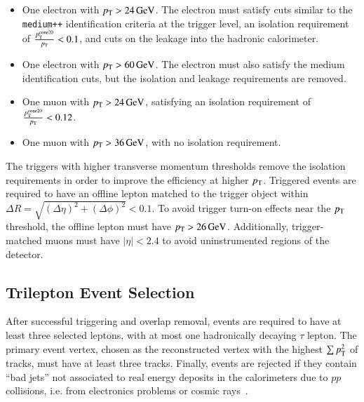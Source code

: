 \begin{itemize}
	\item One electron with $p_{\text{T}}>\SI{24}{\giga\electronvolt}$. The electron must satisfy cuts similar to the \texttt{medium++} identification criteria at the trigger level, an isolation requirement of $\frac{p_{\text{T}}^{\mathrm{cone}20}}{p_{\text{T}}}<0.1$, and cuts on the leakage into the hadronic calorimeter.
	\item One electron with $p_{\text{T}}>\SI{60}{\giga\electronvolt}$. The electron must also satisfy the medium identification cuts, but the isolation and leakage requirements are removed.
	\item One muon with $p_{\text{T}}>\SI{24}{\giga\electronvolt}$, satisfying an isolation requirement of $\frac{p_{\text{T}}^{\mathrm{cone}20}}{p_{\text{T}}}<0.12$.
	\item One muon with $p_{\text{T}}>\SI{36}{\giga\electronvolt}$, with no isolation requirement.
\end{itemize}

The triggers with higher transverse momentum thresholds remove the isolation requirements in order to improve the efficiency at higher $p_{\text{T}}$. Triggered events are required to have an offline lepton matched to the trigger object within $\Delta R=\sqrt{(\Delta\eta)^2+(\Delta\phi)^2} < 0.1$. To avoid trigger turn-on effects near the $p_{\text{T}}$ threshold, the offline lepton must have $p_{\text{T}}>\SI{26}{\giga\electronvolt}$. Additionally, trigger-matched muons must have $|\eta|<2.4$ to avoid uninstrumented regions of the detector.


\subsection{Trilepton Event Selection}\label{sec:model-independent-trilepton-event-selection}
After successful triggering and overlap removal, events are required to have at least three selected leptons, with at most one hadronically decaying $\tau$ lepton. The primary event vertex, chosen as the reconstructed vertex with the highest $\sum p_{\text{T}}^2$ of tracks, must have at least three tracks. Finally, events are rejected if they contain ``bad jets'' not associated to real energy deposits in the calorimeters due to $pp$ collisions, i.e. from electronics problems or cosmic rays~\cite{TheATLASCollaboration:2015ds}.


